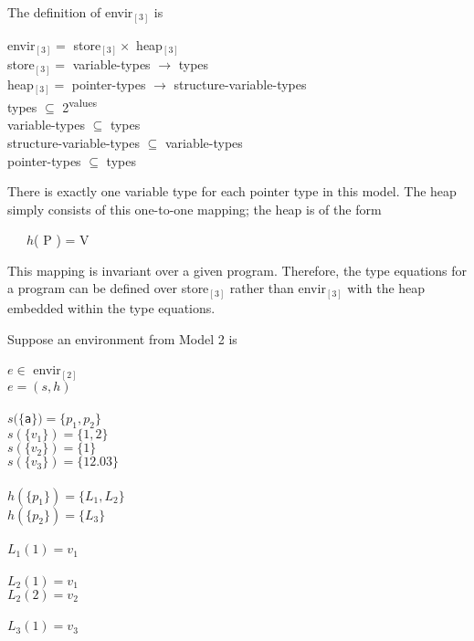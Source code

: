\noindent
The definition of envir$_{[3]}$ is 

\goodbreak
\begin{specialcode}{}
\>envir$_{[3]} = $ store$_{[3]} \times $ heap$_{[3]}$\\
\>store$_{[3]} = $ variable-types $\rightarrow $ types\\
\>heap$_{[3]} = $ pointer-types $\rightarrow $ structure-variable-types\\
\>types ${\subseteq}$ 2\textsuperscript{values}\\
\>variable-types ${\subseteq}$ types\\
\>structure-variable-types ${\subseteq}$ variable-types\\
\>pointer-types ${\subseteq}$ types\\
\end{specialcode}


There is exactly one variable type for each pointer type in this
model. The heap simply consists of this one-to-one mapping; the heap
is of the form

{\ttfamily\mdseries
\ \ \ $h$( P ) = V}

This mapping is invariant over a given program. Therefore, the type
equations for a program can be defined over store$_{[3]}$ rather than
envir$_{[3]}$ with the heap embedded within the type equations.

Suppose an environment from Model 2 is 

\goodbreak
\begin{specialcode}{}
\> $e \in $ envir$_{[2]}$\\
\> $e = (s, h)$\\
\\
\> $s(\{$\texttt{a}$\}) = \{ p_1 , p_2\}$\\
\> $s(\{v_1\}) = \{1, 2\}$\\
\> $s(\{v_2\}) = \{1\}$\\
\> $s(\{v_3\}) = \{12.03\}$\\
\\
\> $h(\{p_1\}) = \{L_1, L_2\}$\\
\> $h(\{p_2\}) = \{L_3\}$\\
\\
\> $L_1(1) = v_1$\\
\\
\> $L_2(1) = v_1$\\
\> $L_2(2) = v_2$\\
\\
\> $L_3(1) = v_3$\\
\end{specialcode}


